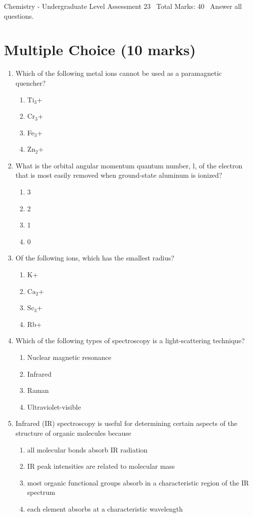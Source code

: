 \documentclass[12pt]{article}
\begin{document}
\begin{center}
Chemistry - Undergraduate Level Assessment 23 \
Total Marks: 40 \
Answer all questions.
\end{center}

\section*{Multiple Choice (10 marks)}
\begin{enumerate}[label=\arabic*.]
\item Which of the following metal ions cannot be used as a paramagnetic quencher?
\begin{enumerate}[label=(\alph*)]
    \item Ti$_{3}$+
    \item Cr$_{3}$+
    \item Fe$_{3}$+
    \item Zn$_{2}$+
\end{enumerate}
\item What is the orbital angular momentum quantum number, l, of the electron that is most easily removed when ground-state aluminum is ionized?
\begin{enumerate}[label=(\alph*)]
    \item 3
    \item 2
    \item 1
    \item 0
\end{enumerate}
\item Of the following ions, which has the smallest radius?
\begin{enumerate}[label=(\alph*)]
    \item K+
    \item Ca$_{2}$+
    \item Sc$_{3}$+
    \item Rb+
\end{enumerate}
\item Which of the following types of spectroscopy is a light-scattering technique?
\begin{enumerate}[label=(\alph*)]
    \item Nuclear magnetic resonance
    \item Infrared
    \item Raman
    \item Ultraviolet-visible
\end{enumerate}
\item Infrared (IR) spectroscopy is useful for determining certain aspects of the structure of organic molecules because
\begin{enumerate}[label=(\alph*)]
    \item all molecular bonds absorb IR radiation
    \item IR peak intensities are related to molecular mass
    \item most organic functional groups absorb in a characteristic region of the IR spectrum
    \item each element absorbs at a characteristic wavelength
\end{enumerate}
\end{enumerate}
\end{document}
